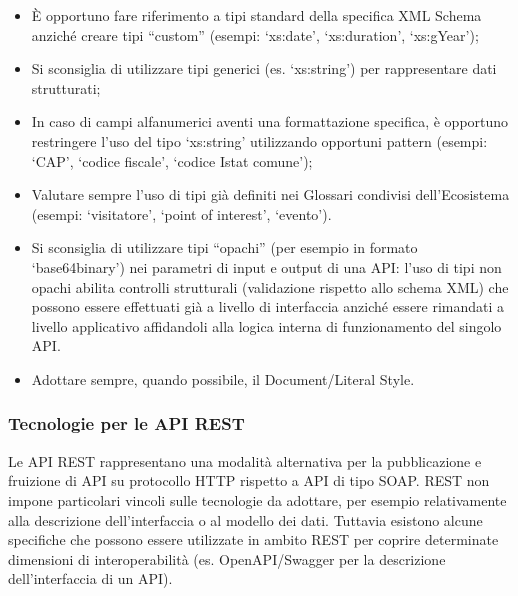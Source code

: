 \documentclass[letterpaper,10pt,italian]{sphinxmanual}
\begin{document}
\begin{itemize}
\item {} 
È opportuno fare riferimento a tipi standard della specifica XML Schema anziché creare tipi “custom” (esempi: ‘xs:date’, ‘xs:duration’, ‘xs:gYear’);

\item {} 
Si sconsiglia di utilizzare tipi generici (es. ‘xs:string’) per rappresentare dati strutturati;

\item {} 
In caso di campi alfanumerici aventi una formattazione specifica, è opportuno restringere l’uso del tipo ‘xs:string’ utilizzando opportuni pattern (esempi: ‘CAP’, ‘codice fiscale’, ‘codice Istat comune’);

\item {} 
Valutare sempre l’uso di tipi già definiti nei Glossari condivisi dell’Ecosistema (esempi: ‘visitatore’, ‘point of interest’, ‘evento’).

\end{itemize}

\begin{itemize}
\item {} 
Si sconsiglia di utilizzare tipi “opachi” (per esempio in formato ‘base64binary’) nei parametri di input e output di una API: l’uso di tipi non opachi abilita controlli strutturali (validazione rispetto allo schema XML) che possono essere effettuati già a livello di interfaccia anziché essere rimandati a livello applicativo affidandoli alla logica interna di funzionamento del singolo API.

\item {} 
Adottare sempre, quando possibile, il Document/Literal Style.

\end{itemize}


\subsubsection{Tecnologie per le API REST}
\label{\detokenize{sez21:sezione2122}}\label{\detokenize{sez21:tecnologie-per-le-api-rest}}
Le API REST rappresentano una modalità alternativa per la pubblicazione e fruizione di API su protocollo HTTP rispetto a API di tipo SOAP. REST non impone particolari vincoli sulle tecnologie da adottare, per esempio relativamente alla descrizione dell’interfaccia o al modello dei dati. Tuttavia esistono alcune specifiche che possono essere utilizzate in ambito REST per coprire determinate dimensioni di interoperabilità (es. OpenAPI/Swagger per la descrizione dell’interfaccia di un API).
\end{document}
